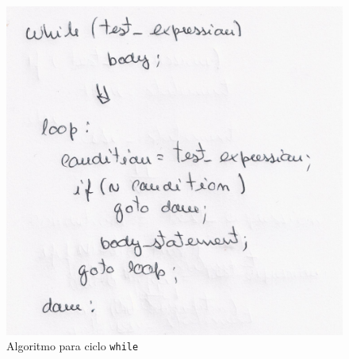 \begin{figure}[<+htpb+>]
	\centering
	\includegraphics[scale=0.75]{./report/img/while.png}
	\caption{Algoritmo para ciclo \texttt{while}}
\label{fig:figure1}
\end{figure}
